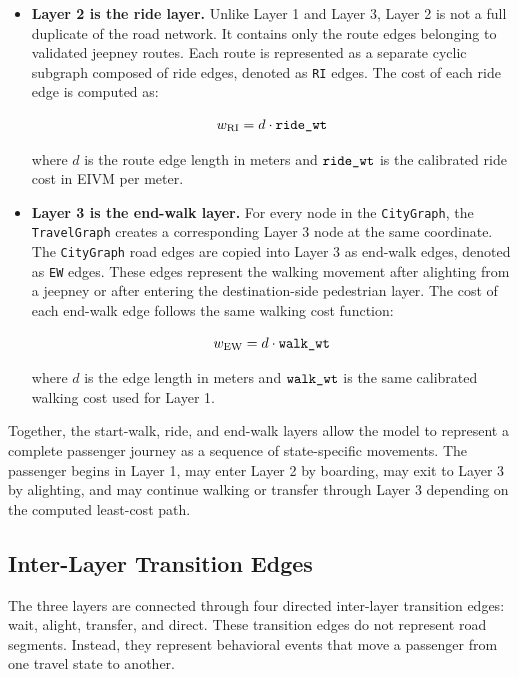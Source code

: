 {{\begin{itemize}
    \item \textbf{Layer 2 is the ride layer.} Unlike Layer 1 and Layer 3, Layer 2 is not a full duplicate of the road network. It contains only the route edges belonging to validated jeepney routes. Each route is represented as a separate cyclic subgraph composed of ride edges, denoted as \texttt{RI} edges. The cost of each ride edge is computed as:

    \begin{equation}
    w_{\mathrm{RI}} = d \cdot \text{\texttt{ride\_wt}}
    \end{equation}

    where \(d\) is the route edge length in meters and \(\text{\texttt{ride\_wt}}\) is the calibrated ride cost in \ac{EIVM} per meter.

    \item \textbf{Layer 3 is the end-walk layer.} For every node in the \texttt{CityGraph}, the \texttt{TravelGraph} creates a corresponding Layer 3 node at the same coordinate. The \texttt{CityGraph} road edges are copied into Layer 3 as end-walk edges, denoted as \texttt{EW} edges. These edges represent the walking movement after alighting from a jeepney or after entering the destination-side pedestrian layer. The cost of each end-walk edge follows the same walking cost function:

    \begin{equation}
    w_{\mathrm{EW}} = d \cdot \text{\texttt{walk\_wt}}
    \end{equation}

    where \(d\) is the edge length in meters and \(\text{\texttt{walk\_wt}}\) is the same calibrated walking cost used for Layer 1.
\end{itemize}

Together, the start-walk, ride, and end-walk layers allow the model to represent a complete passenger journey as a sequence of state-specific movements. The passenger begins in Layer 1, may enter Layer 2 by boarding, may exit to Layer 3 by alighting, and may continue walking or transfer through Layer 3 depending on the computed least-cost path.

\subsection{Inter-Layer Transition Edges}
The three layers are connected through four directed inter-layer transition edges: wait, alight, transfer, and direct. These transition edges do not represent road segments. Instead, they represent behavioral events that move a passenger from one travel state to another.

}}
